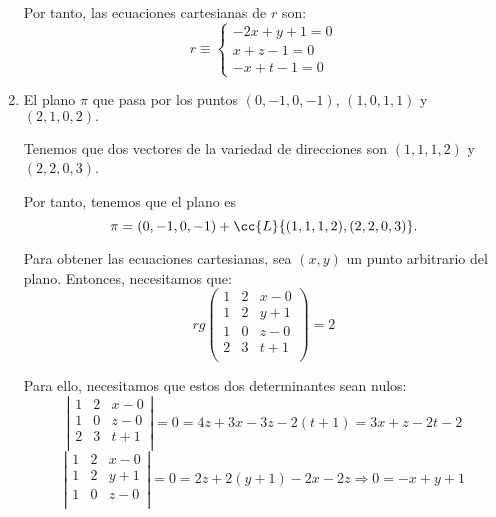 \begin{ejercicio}
\begin{enumerate}
        Por tanto, las ecuaciones cartesianas de $r$ son:
        \begin{equation*}
            r\equiv \left\{\begin{array}{l}
                -2x+y+1=0\\
                x+z-1=0\\
                -x+t-1=0
            \end{array}\right.
        \end{equation*}
        
        \item El plano $\pi$ que pasa por los puntos $(0, -1, 0, -1)$, $(1, 0, 1, 1)$ y $(2, 1, 0, 2).$

        Tenemos que dos vectores de la variedad de direcciones son $(1,1,1,2)$ y $(2, 2, 0, 3)$.

        Por tanto, tenemos que el plano es $$\pi=(0,-1,0,-1) + \cc{L}\{(1,1,1,2), (2,2,0,3)\}.$$

        Para obtener las ecuaciones cartesianas, sea $(x,y)$ un punto arbitrario del plano. Entonces, necesitamos que:
        \begin{equation*}
            rg\left(\begin{array}{ccc}
                1 & 2 & x-0 \\
                1 & 2 & y+1 \\
                1 & 0 & z-0 \\
                2 & 3 & t+1 \\
            \end{array}\right) = 2
        \end{equation*}

        Para ello, necesitamos que estos dos determinantes sean nulos:
        \begin{equation*}
            \left|\begin{array}{ccc}
                1 & 2 & x-0 \\
                1 & 0 & z-0 \\
                2 & 3 & t+1 \\
            \end{array}\right| = 0 = 4z+3x-3z-2(t+1) = 3x +z -2t-2
        \end{equation*}
        \begin{equation*}
            \left|\begin{array}{ccc}
                1 & 2 & x-0 \\
                1 & 2 & y+1 \\
                1 & 0 & z-0 \\
            \end{array}\right| = 0 = 2z+2(y+1) -2x-2z \Longrightarrow 0= -x + y+1
        \end{equation*}


\end{enumerate}
\end{ejercicio}
